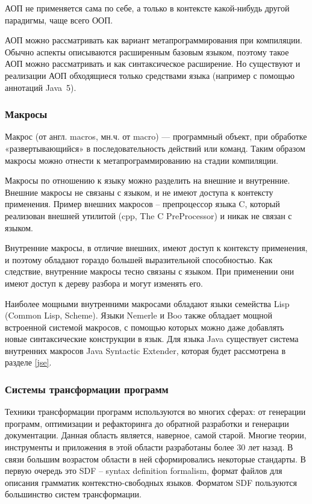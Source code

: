 \documentclass[a4paper,12pt]{article}
\begin{document}
АОП не применяется сама по себе, а только в контексте какой-нибудь другой
парадигмы, чаще всего ООП.

АОП можно рассматривать как вариант метапрограммирования при компиляции.
Обычно аспекты описываются расширенным базовым языком, поэтому такое АОП можно
рассматривать и как синтаксическое расширение. Но существуют и реализации АОП
обходящиеся только средствами языка (например с помощью аннотаций Java~5).

\subsubsection{Макросы}
 Макрос (от англ. macros, мн.ч. от macro) — программный объект, при обработке
«развертывающийся» в последовательность действий или команд. Таким образом
макросы можно отнести к метапрограммированию на стадии компиляции.

Макросы по отношению к языку можно разделить на внешние и внутренние.
Внешние макросы не связаны с языком, и не имеют доступа к контексту применения.
Пример внешних макросов -- препроцессор языка C, который реализован внешней
утилитой (cpp, The C PreProcessor) и никак не связан с языком.

Внутренние макросы, в отличие внешних, имеют доступ к контексту применения, и
поэтому обладают гораздо большей выразительной способностью. Как следствие,
внутренние макросы тесно связаны с языком. При применении они имеют доступ к
дереву разбора и могут изменять его.

Наиболее мощными внутренними макросами обладают языки семейства Lisp
(Common Lisp, Scheme). Языки Nemerle и Boo также обладает мощной встроенной
системой макросов, с помощью которых можно даже добавлять новые синтаксические
конструкции в язык. Для языка Java существует система внутренних макросов Java
Syntactic Extender, которая будет рассмотрена в разделе \ref{jse}.

\subsubsection{Системы трансформации программ}
Техники трансформации программ используются во многих сферах: от генерации
программ, оптимизации и рефакторинга до обратной разработки и генерации
документации.
Данная область является, наверное, самой старой. Многие теории, инструменты и
приложения в этой области разработаны более 30 лет назад.
В связи большим возрастом области в ней сформировались некоторые стандарты.
В первую очередь это SDF \cite{sdf} -- syntax definition formalism, формат
файлов для описания грамматик контекстно-свободных языков. Форматом SDF пользуются
большинство систем трансформации.
\end{document}
